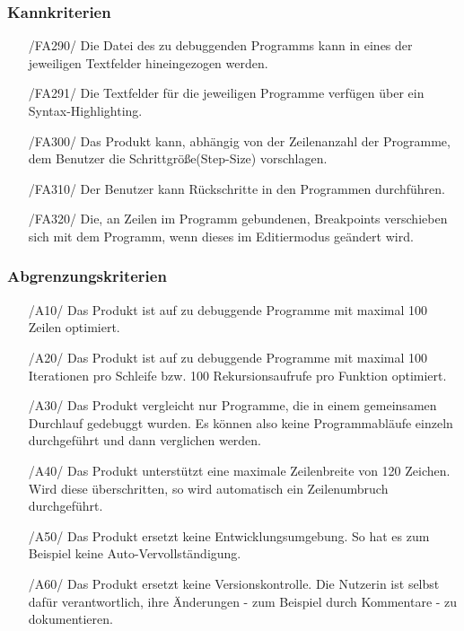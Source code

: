 \documentclass[parskip=full]{scrartcl}
\begin{document}
 		\subsubsection{Kannkriterien}
		\begin{itemize}
		\item[/FA290/] Die Datei des zu debuggenden Programms kann in eines der jeweiligen Textfelder hineingezogen werden.
		\item[/FA291/] Die Textfelder für die jeweiligen Programme verfügen über ein Syntax-Highlighting.
		\item[/FA300/] Das Produkt kann, abhängig von der Zeilenanzahl der Programme, dem Benutzer die Schrittgröße(Step-Size) vorschlagen.
		\item[/FA310/] Der Benutzer kann Rückschritte in den Programmen durchführen.
		\item[/FA320/] Die, an Zeilen im Programm gebundenen, \glspl{Breakpoint} verschieben sich mit dem Programm, wenn dieses im \gls{Editiermodus} geändert wird.
		\end{itemize}		 		
 		
 		
 		\subsubsection{Abgrenzungskriterien}
 		\begin{itemize}
 		\item[/A10/] Das Produkt ist auf zu debuggende Programme mit maximal 100 Zeilen optimiert.
 		\item[/A20/] Das Produkt ist auf zu debuggende Programme mit maximal 100 Iterationen pro Schleife bzw. 100 Rekursionsaufrufe pro Funktion optimiert.
 		\item[/A30/] Das Produkt vergleicht nur Programme, die in einem gemeinsamen Durchlauf gedebuggt wurden. Es können also keine Programmabläufe einzeln durchgeführt und dann verglichen werden.
 		\item[/A40/] Das Produkt unterstützt eine maximale Zeilenbreite von 120 Zeichen. Wird diese überschritten, so wird automatisch ein Zeilenumbruch durchgeführt.
 		\item[/A50/] Das Produkt ersetzt keine Entwicklungsumgebung. So hat es zum Beispiel keine Auto-Vervollständigung.
 		\item[/A60/] Das Produkt ersetzt keine Versionskontrolle. Die Nutzerin ist selbst dafür verantwortlich, ihre Änderungen - zum Beispiel durch Kommentare - zu dokumentieren.
 		\end{itemize}
 		
\end{document}
